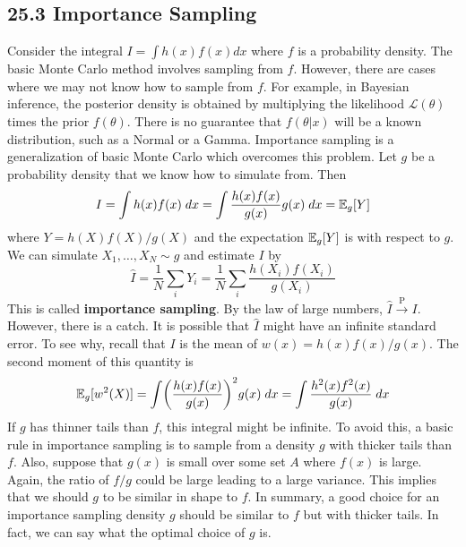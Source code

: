 \subsection*{25.3 Importance Sampling}\label{importance-sampling}
Consider the integral \(I = \int h(x) f(x) dx\) where \(f\) is a
probability density. The basic Monte Carlo method involves sampling from
\(f\). However, there are cases where we may not know how to sample from
\(f\). For example, in Bayesian inference, the posterior density is
obtained by multiplying the likelihood \(\mathcal{L}(\theta)\) times the
prior \(f(\theta)\). There is no guarantee that \(f(\theta | x)\) will
be a known distribution, such as a Normal or a Gamma.
Importance sampling is a generalization of basic Monte Carlo which
overcomes this problem. Let \(g\) be a probability density that we know
how to simulate from. Then
\[
I = \int h(x) f(x) \; dx = \int \frac{h(x) f(x)}{g(x)} g(x) \; dx  = \operatorname{\mathbb{E}}_g[Y]
\]
where \(Y = h(X) f(X) / g(X)\) and the expectation \(\operatorname{\mathbb{E}}_g[Y]\)
is with respect to \(g\). We can simulate \(X_{1}, \dots, X_N \sim g\) and
estimate \(I\) by
\[
\hat{I} = \frac{1}{N} \sum_{i} Y_{i} = \frac{1}{N} \sum_{i} \frac{h(X_{i}) f(X_{i})}{g(X_{i})}
\]
This is called \textbf{importance sampling}. By the law of large
numbers, \(\hat{I} \xrightarrow{\textrm{P}} I\). However, there is a
catch. It is possible that \(\hat{I}\) might have an infinite standard
error. To see why, recall that \(I\) is the mean of
\(w(x) = h(x) f(x) / g(x)\). The second moment of this quantity is
\[
\EXP_g[w^{2}(X)] = \int \left( \frac{h(x) f(x)}{g(x)} \right)^{2} g(x) \; dx = \int \frac{h^{2}(x) f^{2}(x)}{g(x)} \; dx
\]
If \(g\) has thinner tails than \(f\), this integral might be infinite.
To avoid this, a basic rule in importance sampling is to sample from a
density \(g\) with thicker tails than \(f\). Also, suppose that \(g(x)\)
is small over some set \(A\) where \(f(x)\) is large. Again, the ratio
of \(f / g\) could be large leading to a large variance. This implies
that we should \(g\) to be similar in shape to \(f\). In summary, a good
choice for an importance sampling density \(g\) should be similar to
\(f\) but with thicker tails. In fact, we can say what the optimal
choice of \(g\) is.

